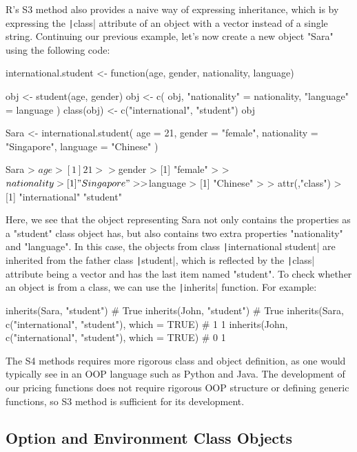 R's S3 method also provides a naive way of expressing inheritance, which is by expressing the \texttt|class| attribute of an object with a vector instead of a single string. Continuing our previous example, let's now create a new object "Sara" using the following code:

\begin{Rminted}
international.student <- function(age, gender, nationality, language) {
    
    obj <- student(age, gender)
    obj <- c(
        obj,
        "nationality" = nationality,
        "language" = language
    )
    class(obj) <- c("international", "student")
    obj
}

Sara <- international.student(
    age = 21,
    gender = "female",
    nationality = "Singapore",
    language = "Chinese"
)

Sara
> $age
> [1] 21
> 
> $gender
> [1] "female"
> 
> $nationality
> [1] "Singapore"
> 
> $language
> [1] "Chinese"
> 
> attr(,"class")
> [1] "international" "student"    
\end{Rminted}

Here, we see that the object representing Sara not only contains the properties as a "student" class object has, but also contains two extra properties "nationality" and "language". In this case, the objects from class \texttt|international student| are inherited from the father class \texttt|student|, which is reflected by the \texttt|class| attribute being a vector and has the last item named "student". To check whether an object is from a class, we can use the \texttt|inherits| function. For example:

\begin{Rminted}
inherits(Sara, "student") # True
inherits(John, "student") # True
inherits(Sara, c("international", "student"), which = TRUE) # 1 1
inherits(John, c("international", "student"), which = TRUE) # 0 1
\end{Rminted}

The S4 methods requires more rigorous class and object definition, as one would typically see in an OOP language such as Python and Java. The development of our pricing functions does not require rigorous OOP structure or defining generic functions, so S3 method is sufficient for its development.

\subsection{Option and Environment Class Objects}

